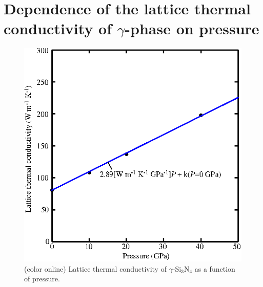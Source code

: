 \documentclass[twocolumn,amsmath,amssymb,a4paper,prb,superscriptaddress,floatfix]{revtex4-1}
\begin{document}
\appendix
\section{Dependence of the lattice thermal conductivity of $\gamma$-phase on
pressure}
\begin{figure}[ht]
 \begin{center}
  \includegraphics[width=0.80\linewidth]{S1.eps} \caption{(color online)
  Lattice thermal conductivity of $\gamma$-Si$_3$N$_4$ as a function of pressure.  \label{fig:S1} }
 \end{center}
\end{figure}

\end{document}
